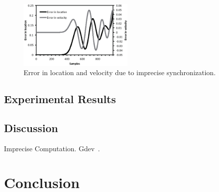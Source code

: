 \documentclass[times, 10pt, twocolumn]{article}
\begin{document}
\begin{figure}[t]
\centering
\includegraphics[width=0.5\textwidth]{eps/eval_error.eps}
\caption{Error in location and velocity due to imprecise synchronization.}
\label{fig:eval_error}
\end{figure}

\subsection{Experimental Results}
\label{sec:experimental_results}

\subsection{Discussion}
\label{sec:discussion}

Imprecise Computation.
Gdev~\cite{Kato2012}.

\section{Conclusion}
\label{sec:conclusion}


{\footnotesize

}
\end{document}
